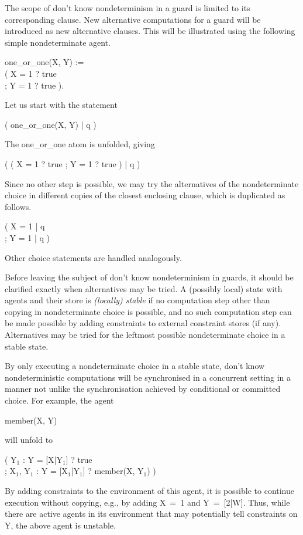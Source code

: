 The scope of don't know nondeterminism in a guard is limited to its
corresponding clause.  New alternative computations for a guard will be
introduced as new alternative clauses.  This will be illustrated using
the following simple nondeterminate agent.
%
\begin{program}
one_or_one(X, Y) := \\
\>\>( X = 1 ? true \\
\>\>; Y = 1 ? true ).
\end{program}%
%
Let us start with the statement
%
\begin{progex}
( one_or_one(X, Y) | q )
\end{progex}%
%
The {\prog one_or_one} atom is unfolded, giving
%
\begin{progex}
( ( X = 1 ? true ; Y = 1 ? true ) | q )
\end{progex}%
%
Since no other step is possible, we may try the alternatives of the
nondeterminate choice in different copies of the closest enclosing
clause, which is duplicated as follows.
%
\begin{progex}
( X = 1 | q \\
; Y = 1 | q )
\end{progex}%
%
Other choice statements are handled analogously.

Before leaving the subject of don't know nondeterminism in guards, it
should be clarified exactly when alternatives may be tried.  A
(possibly local) state with agents and their store is {\em (locally)
stable} if no computation step other than copying in nondeterminate
choice is possible, and no such computation step can be made possible
by adding constraints to external constraint stores (if any).
Alternatives may be tried for the leftmost possible nondeterminate
choice in a stable state.

By only executing a nondeterminate choice in a stable state, don't
know nondeterministic computations will be synchronised in a
concurrent setting in a manner not unlike the synchronisation achieved
by conditional or committed choice.  For example, the agent
%
\begin{progex}
member(X, Y)
\end{progex}%
%
will unfold to
%
\begin{progex}
( Y$_1$ : Y = [X|Y$_1$] ? true \\
; X$_1$, Y$_1$ : Y = [X$_1$|Y$_1$] ? member(X, Y$_1$) )
\end{progex}%
%
By adding constraints to the environment of this agent, it is possible
to continue execution without copying, e.g., by adding {\prog X~=~1}
and {\prog Y~=~[2|W]}.  Thus, while there are active agents in its
environment that may potentially tell constraints on {\prog Y}, the above
agent is unstable.

